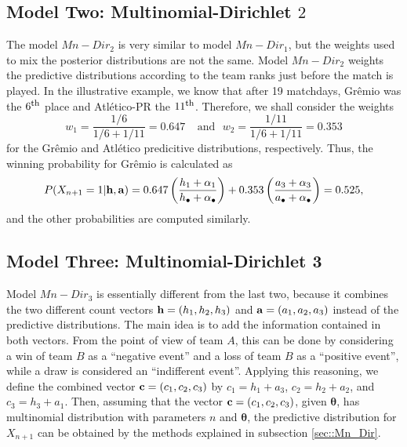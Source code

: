 \documentclass[journal,article,accept,moreauthors,pdftex,12pt,a4paper]{mdpi}
\begin{document}
    \subsection{Model Two: Multinomial-Dirichlet $2$}
    \label{sec::Mn_Dir2}

    The model $Mn-Dir_2$ is very similar to model $Mn-Dir_1$, but the
    weights used to mix the posterior distributions are not the same.
    Model $Mn-Dir_2$ weights the predictive distributions according to
    the team ranks just before the match is played. In the illustrative
    example, we know that after 19 matchdays, Gr\^emio was the $6^{\footnotesize\mbox{th}}$
    place and Atl\'etico-PR the $11^{\footnotesize\mbox{th}}$. Therefore, we shall consider
    the weights
    \[w_1 = \frac{1/6}{1/6+1/11}=0.647 ~ ~ ~ ~ ~\text{and} ~ ~ ~ w_2 = \frac{1/11}{1/6+1/11}=0.353\]
    \noindent for the Gr\^emio and Atl\'etico predicitive distributions,
    respectively. Thus, the winning probability for Gr\^emio is
    calculated as
    \[P(X_{n+1}= 1|{\bf h}, {\bf a})=0.647\left(\frac{h_1+\alpha_1}{h_{\bullet}+\alpha_{\bullet}}\right)+0.353\left(\frac{a_3+\alpha_3}{a_{\bullet}+\alpha_{\bullet}}\right)=0.525,\]
    \noindent and the other probabilities are computed similarly.

    \subsection{Model Three: Multinomial-Dirichlet 3}
    \label{sec::Mn_Dir3}

    Model $Mn-Dir_3$ is essentially different from the
    last two, because it combines the two different count vectors ${\bf
        h} = (h_1, h_2, h_3)$ and ${\bf a} = (a_1, a_2, a_3)$ instead of the
    predictive distributions. The main idea is to add the information
    contained in both vectors. From the point of view of team $A$, this can
    be done by considering a win of team $B$ as a ``negative event'' and a
    loss of team $B$ as a ``positive event'', while a draw is
    considered an ``indifferent event''. Applying this reasoning,
    we define the combined vector ${\bf c} = (c_1, c_2, c_3)$ by $c_1 =
    h_1 + a_3$, $c_2 = h_2 + a_2$, and $c_3 = h_3 + a_1$. Then, assuming that the vector ${\bf c} = (c_1, c_2, c_3)$, given $\boldsymbol{\theta}$, has multinomial distribution with parameters $n$ and
    $\boldsymbol{\theta}$, the predictive distribution for $X_{n + 1}$ can
    be obtained by the methods explained in subsection
    \ref{sec::Mn_Dir}.
\end{document}
